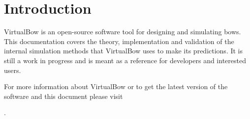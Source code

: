 
\chapter{Introduction}

VirtualBow is an open-source software tool for designing and simulating bows.
This documentation covers the theory, implementation and validation of the internal simulation methods that VirtualBow uses to make its predictions.
It is still a work in progress and is meant as a reference for developers and interested users.

For more information about VirtualBow or to get the latest version of the software and this document please visit

\website.